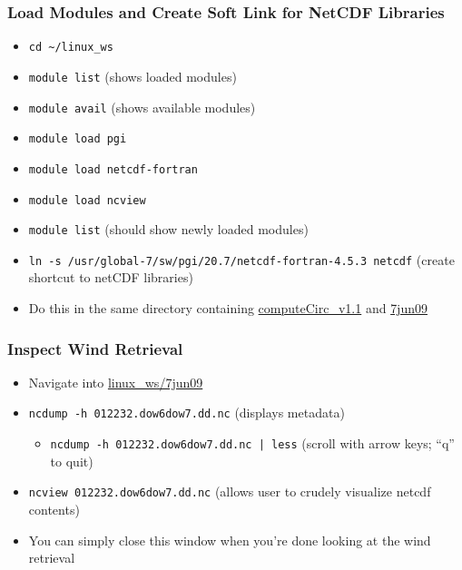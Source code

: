 \documentclass[hyperref,pdfa,unicode,utf8,usepdftitle]{beamer}
\begin{document}
\begin{frame}
  \frametitle{Load Modules and Create Soft Link for NetCDF Libraries}
  \begin{itemize}
  \item \lstinline{cd ~/linux_ws}
  \item \lstinline{module list} (shows loaded modules)
  \item \lstinline{module avail} (shows available modules)
  \item \lstinline{module load pgi}
  \item \lstinline{module load netcdf-fortran}
  \item \lstinline{module load ncview}
  \item \lstinline{module list} (should show newly loaded modules)
  \item
    \lstinline{ln -s /usr/global-7/sw/pgi/20.7/netcdf-fortran-4.5.3 netcdf}
    (create shortcut to netCDF libraries)
  \item Do this in the same directory
    containing \url{computeCirc_v1.1} and \url{7jun09}
  \end{itemize}
\end{frame}

\begin{frame}
  \frametitle{Inspect Wind Retrieval}
  \begin{itemize}
  \item Navigate into \url{linux_ws/7jun09}
  \item \lstinline{ncdump -h 012232.dow6dow7.dd.nc} (displays
    metadata)
    \begin{itemize}
    \item \lstinline{ncdump -h 012232.dow6dow7.dd.nc | less} (scroll
      with arrow keys; “q” to quit)
    \end{itemize}
  \item \lstinline{ncview 012232.dow6dow7.dd.nc} (allows user to
    crudely visualize netcdf contents)
  \item You can simply close this window when you’re done looking at
    the wind retrieval
  \end{itemize}
\end{frame}
\end{document}
